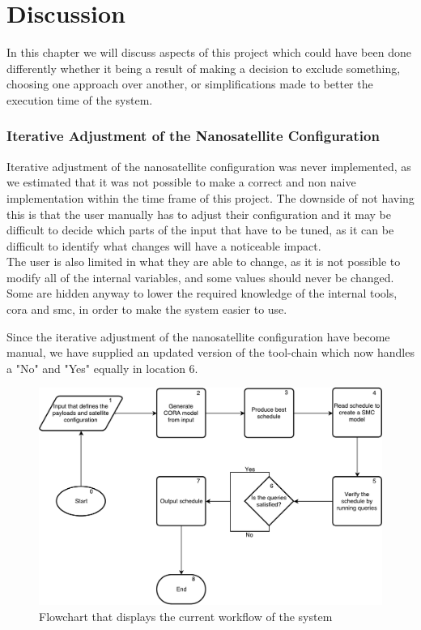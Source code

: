 \chapter{Discussion} \label{sec:discussion}
In this chapter we will discuss aspects of this project which could have been done differently whether it being a result of making a decision to exclude something, choosing one approach over another, or simplifications made to better the execution time of the system.

\subsection*{Iterative Adjustment of the Nanosatellite Configuration} \label{subsec:disc_itt}
Iterative adjustment of the nanosatellite configuration was never implemented, as we estimated that it was not possible to make a correct and non naive implementation within the time frame of this project.
The downside of not having this is that the user manually has to adjust their configuration and it may be difficult to decide which parts of the input that have to be tuned, as it can be difficult to identify what changes will have a noticeable impact. \\
The user is also limited in what they are able to change, as it is not possible to modify all of the internal variables, and some values should never be changed. Some are hidden anyway to lower the required knowledge of the internal tools, \gls{cora} and \gls{smc}, in order to make the system easier to use. 

Since the iterative adjustment of the nanosatellite configuration have become manual, we have supplied an updated version of the tool-chain which now handles a "No" and "Yes" equally in location 6.
\begin{figure}[h]
	\includegraphics[width=\textwidth]{graphics/flow_act.pdf}
	\caption{Flowchart that displays the current workflow of the system}
	\label{fig:tool_act}
\end{figure}

